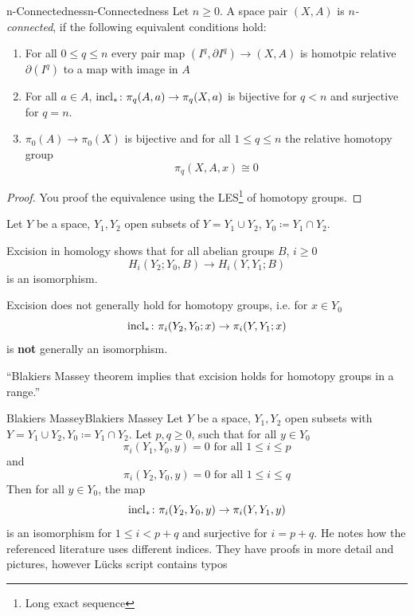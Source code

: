 \documentclass[language=english]{TemplateLecture}
\begin{document}
\begin{defi}{n-Connectedness}{n-Connectedness}
    Let \(n \geq 0\). A space pair \((X,A)\) is \emph{\(n\)-connected}, if the following equivalent conditions hold:
    \begin{enumerate}
        \item For all \(0 \leq q\leq n\) every pair map \((I^q, \partial I^q) \to (X,A)\) is homotpic relative \(\partial(I^q)\) to a map with image in \(A\)
        \item For all \(a \in A\), \(\operatorname{incl}_*\colon \pi_q(A,a) \to \pi_q(X,a)\) is bijective for \(q < n\) and surjective for \(q = n\).
        \item \(\pi_0(A) \to \pi_0(X)\) is bijective and for all \(1 \leq q \leq n\) the relative homotopy group
        \[\pi_q(X,A,x) \cong 0\]
    \end{enumerate}
\end{defi}

\begin{proof}
    You proof the equivalence using the LES\footnote{Long exact sequence} of homotopy groups.
\end{proof}


Let \(Y\) be a space, \(Y_1, Y_2\) open subsets of \(Y = Y_1 \cup Y_2\), \(Y_0 \coloneq Y_1\cap Y_2\).

Excision in homology shows that for all abelian groups \(B\), \(i \geq 0\)
\[H_i(Y_2; Y_0, B) \to H_i(Y,Y_1; B)\]
is an isomorphism.

Excision does not generally hold for homotopy groups, i.e. for \(x \in Y_0\)
\[\operatorname{incl}_*\colon \pi_i(Y_2, Y_0; x) \to \pi_i(Y, Y_1; x)\]
is \textbf{not} generally an isomorphism.

\enquote {Blakiers Massey theorem implies that excision holds for homotopy groups in a range.}

\begin{thm}{Blakiers Massey}{Blakiers Massey}
    Let \(Y\) be a space, \(Y_1, Y_2\) open subsets with \(Y= Y_1 \cup Y_2, Y_0 \coloneq Y_1 \cap Y_2\). Let \(p, q \geq 0\), such that for all \(y \in Y_0\)
    \[\pi_i(Y_1, Y_0, y) = 0 \text{ for all } 1 \leq i \leq p\]
    and
    \[\pi_i(Y_2, Y_0, y) = 0 \text{ for all } 1 \leq i \leq q\]
    Then for all \(y \in Y_0\), the map
    \[\operatorname{incl}_*\colon \pi_i(Y_2, Y_0, y) \to \pi_i(Y, Y_1, y)\]
    is an isomorphism for \(1 \leq i < p+q\) and surjective for \(i = p+q\). He notes how the referenced literature uses different indices. They have proofs in more detail and pictures, however Lücks script contains typos
\end{thm}
\end{document}
